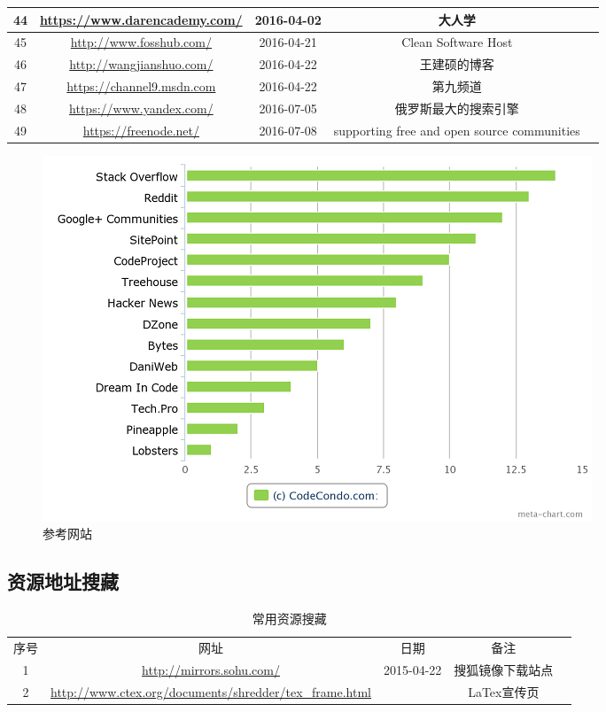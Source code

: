 \documentclass{book}
\begin{document}
\begin{longtable}{|c|c|c|c|c|}
	\hline
	44 & \url{https://www.darencademy.com/} & 2016-04-02 & 大人学\\
	\hline
	45 & \url{http://www.fosshub.com/} & 2016-04-21 & Clean Software Host\\
	\hline
	46 & \url{http://wangjianshuo.com/}	& 2016-04-22 & 王建硕的博客\\
	\hline
	47 & \url{https://channel9.msdn.com} & 2016-04-22 & 第九频道\\
	\hline
	48 & \url{https://www.yandex.com/} & 2016-07-05 & 俄罗斯最大的搜索引擎\\
	\hline
	49 & \url{https://freenode.net/} & 2016-07-08 & supporting free and open source communities\\	
\end{longtable}


\begin{figure}[htbp]
	\centering
	\includegraphics[scale=0.8]{14-communities-programmers-go.png}
	\caption{参考网站}
	\label{DeobfuscationedDll}
\end{figure}

\subsection{资源地址搜藏}

\begin{longtable}{|c|c|c|c|c|}
	\caption{常用资源搜藏}\\
	\hline
	\multirow{1}{*}{序号}
	& \multicolumn{1}{c|}{网址}  
	& \multicolumn{1}{c|}{日期} 
	& \multicolumn{1}{c|}{备注}\\			
	\cline{1-4}
	1 & \url{http://mirrors.sohu.com/} & 2015-04-22 & 搜狐镜像下载站点\\
	\hline
	2 & \url{http://www.ctex.org/documents/shredder/tex_frame.html} & & LaTex宣传页\\
	\hline
\end{longtable}
\end{document}
